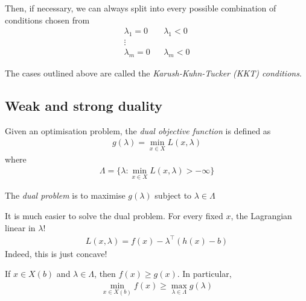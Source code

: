 \documentclass{../../template/note}
\begin{document}
    Then, if necessary, we can always split into every possible combination of conditions chosen from
    \begin{align*}
        \lambda_1 = 0 && \lambda_1 < 0 \\
        \vdots \\
        \lambda_m = 0 && \lambda_m < 0
    \end{align*}   

    \begin{remark*}
        The cases outlined above are called the \emph{Karush-Kuhn-Tucker (KKT) conditions}.
    \end{remark*}    

    \subsection{Weak and strong duality}

    \begin{definition}
        Given an optimisation problem, the \emph{dual objective function} is defined as
        \begin{align*}
            g(\lambda) = \min_{x \in X} L(x, \lambda)
        \end{align*}
        where
        \begin{align*}
            \Lambda = \{\lambda: \min_{x \in X} L(x, \lambda) > -\infty\}
        \end{align*}       
    \end{definition}
    
    \begin{definition}
        The \emph{dual problem} is to maximise $g(\lambda)$ subject to $\lambda \in \Lambda$
    \end{definition}
    
    \begin{remark*}
        It is much easier to solve the dual problem. For every fixed $x$, the Lagrangian linear in $\lambda$!
        \begin{align*}
            L(x, \lambda) = f(x) - \lambda^\intercal (h(x)-b)
        \end{align*}
        Indeed, this is just concave!        
    \end{remark*}
    
    \begin{theorem}
        If $x \in X(b)$ and $\lambda \in \Lambda$, then $f(x) \geq g(x)$. In particular,
        \begin{align*}
            \min_{x \in X(b)} f(x) \geq \max_{\lambda \in \Lambda} g(\lambda)
        \end{align*}
    \end{theorem}
    
\end{document}
